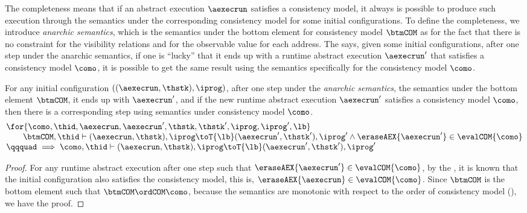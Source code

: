 The completeness means that if an abstract execution \( \aexecrun \) satisfies a consistency model, it always is possible to produce such execution through the semantics under the corresponding consistency model for some initial configurations.
To define the completeness, we introduce \emph{anarchic semantics}, which is the semantics under the bottom element for consistency model \( \btmCOM \) as for the fact that there is no constraint for the visibility relations and for the observable value for each address.
The  says, given some initial configurations, after one step under the anarchic semantics, if one is ``lucky'' that it ends up with a runtime abstract execution \( \aexecrun'\) that satisfies a consistency model \( \como \), it is possible to get the same result using the semantics specifically for the consistency model \( \como \).

\begin{thm}
\label{thm:semantics-completeness}
For any initial configuration \( ( (\aexecrun, \thstk), \iprog ) \), after one step under the \emph{anarchic semantics}, \ie the semantics under the bottom element \( \btmCOM \), it ends up with \( \aexecrun' \), and if the new runtime abstract execution \( \aexecrun' \) satisfies a consistency model \( \como \), then there is a corresponding step using semantics under consistency model \( \como \).
 \[
 \begin{array}{@{}l@{}}
    \for{\como, \thid, \aexecrun, \aexecrun', \thstk, \thstk', \iprog, {\iprog}', \lb} \\
    \qquad \btmCOM, \thid \vdash (\aexecrun, \thstk), \iprog \toT{\lb} (\aexecrun', \thstk'), {\iprog}' \land \eraseAEX{\aexecrun'} \in \evalCOM{\como} \\
    \qqquad \implies \como, \thid \vdash (\aexecrun, \thstk), \iprog \toT{\lb} (\aexecrun', \thstk'), {\iprog}' 
 \end{array}
 \]
\end{thm}
\begin{proof}
For any runtime abstract execution after one step such that \( \eraseAEX{\aexecrun'} \in \evalCOM{\como} \), by the , it is known that the initial configuration also satisfies the consistency model, this is, \( \eraseAEX{\aexecrun} \in \evalCOM{\como} \).
Since \( \btmCOM \) is the bottom element such that \( \btmCOM \ordCOM \como \), because the semantics are monotonic with respect to the order of consistency model (), we have the proof.
\end{proof}
